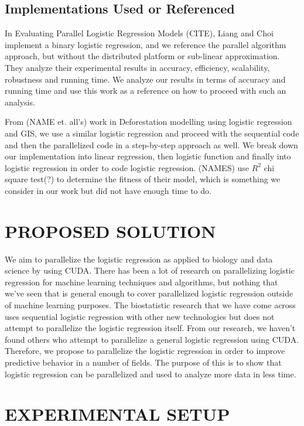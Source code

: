 \documentclass[letterpaper, 10 pt, conference]{ieeeconf}  %
\begin{document}
\subsection{Implementations Used or Referenced} 
In Evaluating Parallel Logistic Regression Models (CITE), Liang and Choi implement a binary logistic regression, and we reference the parallel algorithm approach, but without the distributed platform or sub-linear approximation. They analyze their experimental results in accuracy, efficiency, scalability, robustness and running time. We analyze our results in terms of accuracy and running time and use this work as a reference on how to proceed with such an analysis. 

From (NAME et. all’s) work in Deforestation modelling using logistic regression and GIS, we use a similar logistic regression and proceed with the sequential code and then the parallelized code in a step-by-step approach as well. We break down our implementation into linear regression, then logistic function and finally into logistic regression in order to code logistic regression. (NAMES) use $R^2$ chi square test(?) to determine the fitness of their model, which is something we consider in our work but did not have enough time to do.


\section{PROPOSED SOLUTION}
We aim to parallelize the logistic regression as applied to biology and data science by using CUDA. There has been a lot of research on parallelizing logistic regression for machine learning techniques and algorithms, but nothing that we’ve seen that is general enough to cover parallelized logistic regression outside of machine learning purposes. The biostatistic research that we have come across uses sequential logistic regression with other new technologies but does not attempt to parallelize the logistic regression itself. From our research, we haven’t found others who attempt to parallelize a general logistic regression using CUDA. Therefore, we propose to parallelize the logistic regression in order to improve predictive behavior in a number of fields. The purpose of this is to show that logistic regression can be parallelized and used to analyze more data in less time.

\section{EXPERIMENTAL SETUP}
\end{document}

